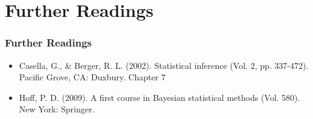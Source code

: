 \documentclass[
  shownotes,
  xcolor={svgnames},
  hyperref={colorlinks,citecolor=DarkBlue,linkcolor=DarkRed,urlcolor=DarkBlue}
  , aspectratio=169]{beamer}
\begin{document}
\section{Further Readings}
\begin{frame}
\frametitle{Further Readings}

\begin{itemize}
  \item Casella, G., \& Berger, R. L. (2002). Statistical inference (Vol. 2, pp. 337-472). Pacific Grove, CA: Duxbury. Chapter 7
  \medskip
  \item Hoff, P. D. (2009). A first course in Bayesian statistical methods (Vol. 580). New York: Springer.
  \medskip
  
  
  
\end{itemize}

\end{frame}

\end{document}
